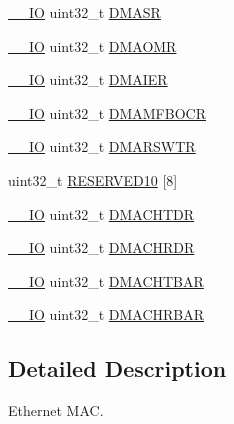 \begin{DoxyCompactItemize}
\item 
\hyperlink{core__sc300_8h_aec43007d9998a0a0e01faede4133d6be}{\+\_\+\+\_\+\+IO} uint32\+\_\+t \hyperlink{struct_e_t_h___type_def_a9e7c3d04e4dcf975939eeaac246b25d0}{D\+M\+A\+SR}
\item 
\hyperlink{core__sc300_8h_aec43007d9998a0a0e01faede4133d6be}{\+\_\+\+\_\+\+IO} uint32\+\_\+t \hyperlink{struct_e_t_h___type_def_aa15b972f30ee47f5df0d3ebc8866509d}{D\+M\+A\+O\+MR}
\item 
\hyperlink{core__sc300_8h_aec43007d9998a0a0e01faede4133d6be}{\+\_\+\+\_\+\+IO} uint32\+\_\+t \hyperlink{struct_e_t_h___type_def_add56f3652fd065c6797411e80477a064}{D\+M\+A\+I\+ER}
\item 
\hyperlink{core__sc300_8h_aec43007d9998a0a0e01faede4133d6be}{\+\_\+\+\_\+\+IO} uint32\+\_\+t \hyperlink{struct_e_t_h___type_def_a12eba1fc5d54aa50fdda201f7f9a84a3}{D\+M\+A\+M\+F\+B\+O\+CR}
\item 
\hyperlink{core__sc300_8h_aec43007d9998a0a0e01faede4133d6be}{\+\_\+\+\_\+\+IO} uint32\+\_\+t \hyperlink{struct_e_t_h___type_def_ac6fe9e194ed9d08bf6bd28ceb80ac4b0}{D\+M\+A\+R\+S\+W\+TR}
\item 
uint32\+\_\+t \hyperlink{struct_e_t_h___type_def_a5df5ed1d3ee855759e52e42b39a5b138}{R\+E\+S\+E\+R\+V\+E\+D10} \mbox{[}8\mbox{]}
\item 
\hyperlink{core__sc300_8h_aec43007d9998a0a0e01faede4133d6be}{\+\_\+\+\_\+\+IO} uint32\+\_\+t \hyperlink{struct_e_t_h___type_def_ab5bb348210fdd9a5538eb57abc5a5673}{D\+M\+A\+C\+H\+T\+DR}
\item 
\hyperlink{core__sc300_8h_aec43007d9998a0a0e01faede4133d6be}{\+\_\+\+\_\+\+IO} uint32\+\_\+t \hyperlink{struct_e_t_h___type_def_a9c49de2e699886d6604fd2b3d376a0e9}{D\+M\+A\+C\+H\+R\+DR}
\item 
\hyperlink{core__sc300_8h_aec43007d9998a0a0e01faede4133d6be}{\+\_\+\+\_\+\+IO} uint32\+\_\+t \hyperlink{struct_e_t_h___type_def_a900f9f888342fbdd8ee07e3ee1d4b73c}{D\+M\+A\+C\+H\+T\+B\+AR}
\item 
\hyperlink{core__sc300_8h_aec43007d9998a0a0e01faede4133d6be}{\+\_\+\+\_\+\+IO} uint32\+\_\+t \hyperlink{struct_e_t_h___type_def_acf3f7ecbf774d8d505655ac7f24761fc}{D\+M\+A\+C\+H\+R\+B\+AR}
\end{DoxyCompactItemize}


\subsection{Detailed Description}
Ethernet M\+AC. 

